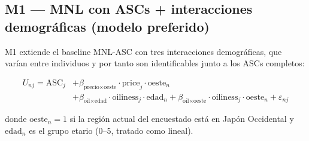 \documentclass[12pt,a4paper]{article}
\begin{document}
\subsection{M1 --- MNL con ASCs + interacciones demográficas (modelo preferido)}

M1 extiende el baseline MNL-ASC con tres interacciones demográficas, que varían entre individuos y por tanto son identificables junto a los ASCs completos:

\begin{equation}
\begin{split}
  U_{nj} = \text{ASC}_j
  &+ \beta_{\text{precio}\times\text{oeste}} \cdot \text{price}_j \cdot \text{oeste}_n \\
  &+ \beta_{\text{oil}\times\text{edad}} \cdot \text{oiliness}_j \cdot \text{edad}_n
   + \beta_{\text{oil}\times\text{oeste}} \cdot \text{oiliness}_j \cdot \text{oeste}_n
   + \varepsilon_{nj}
\end{split}
\label{eq:m1}
\end{equation}

donde $\text{oeste}_n = 1$ si la región actual del encuestado está en Japón Occidental y $\text{edad}_n$ es el grupo etario (0--5, tratado como lineal).
\end{document}
